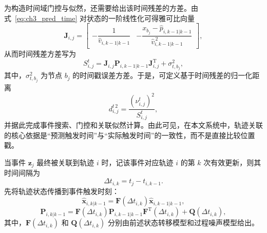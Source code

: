 \documentclass{xdupgthesis}
\begin{document}
为构造时间域门控与似然，还需要给出该时间残差的方差。由式~\eqref{eq:ch3_pred_time} 对状态的一阶线性化可得雅可比向量
\begin{equation}
	\mathbf J_{i,j}
	=
	\begin{bmatrix}
		-\dfrac{1}{\hat v_{i,k-1|k-1}}
		&
		-\dfrac{x_{b_j}-\hat p_{i,k-1|k-1}}{\hat v_{i,k-1|k-1}^{\,2}}
	\end{bmatrix},
	\label{eq:ch3_time_jacobian}
\end{equation}
从而时间残差方差写为
\begin{equation}
	S^{t}_{i,j}
	=
	\mathbf J_{i,j}\mathbf P_{i,k-1|k-1}\mathbf J_{i,j}^{\mathrm T}
	+
	\sigma_{t,b_j}^2,
	\label{eq:ch3_time_var}
\end{equation}
其中，$\sigma_{t,b_j}^2$ 为节点 $b_j$ 的时间戳误差方差。于是，可定义基于时间残差的归一化距离
\begin{equation}
	d^{t\,2}_{i,j}
	=
	\frac{(\nu^{t}_{i,j})^2}{S^{t}_{i,j}},
	\label{eq:ch3_time_maha}
\end{equation}
并据此完成事件搜索、门控和关联似然计算。由此可见，在本文系统中，轨迹关联的核心依据是“预测触发时间”与“实际触发时间”的一致性，而不是直接比较位置戳。

当事件 $\mathbf z_j$ 最终被关联到轨迹 $i$ 时，记该事件对应轨迹 $i$ 的第 $k$ 次有效更新，则其时间间隔为
\begin{equation}
	\Delta t_{i,k}=t_j-t_{i,k-1}.
	\label{eq:ch3_dt_update}
\end{equation}
先将轨迹状态传播到事件触发时刻：
\begin{equation}
	\hat{\mathbf x}_{i,k|k-1}
	=
	\mathbf F(\Delta t_{i,k})\hat{\mathbf x}_{i,k-1|k-1},
	\label{eq:ch3_predict_state}
\end{equation}
\begin{equation}
	\mathbf P_{i,k|k-1}
	=
	\mathbf F(\Delta t_{i,k})
	\mathbf P_{i,k-1|k-1}
	\mathbf F^{\mathrm T}(\Delta t_{i,k})
	+
	\mathbf Q(\Delta t_{i,k}),
	\label{eq:ch3_predict_cov}
\end{equation}
其中，$\mathbf F(\Delta t_{i,k})$ 和 $\mathbf Q(\Delta t_{i,k})$ 分别由前述状态转移模型和过程噪声模型给出。
\end{document}
